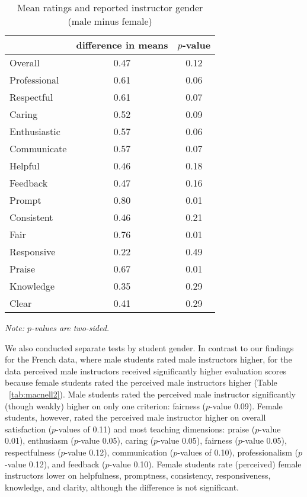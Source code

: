 \documentclass[12pt]{article}
\begin{document}
\begin{table}[htbp]
  \centering
  \footnotesize 
  \caption{Mean ratings and reported instructor gender (male minus female)}
    \begin{tabular}{lcc}
    \toprule 
                          & difference in means  & $p$-value  \\
   \midrule
    Overall &                 0.47       & 0.12   \\
    Professional &            0.61       & 0.06   \\
    Respectful			   &  0.61       & 0.07   \\
    Caring &                  0.52       & 0.09    \\
    Enthusiastic   &          0.57       & 0.06     \\
    Communicate        &      0.57       & 0.07     \\
    Helpful   &               0.46       & 0.18     \\
    Feedback   &              0.47       & 0.16     \\
    Prompt    &               0.80       & 0.01     \\
    Consistent   &            0.46       & 0.21     \\
    Fair   &                  0.76       & 0.01     \\
    Responsive   &            0.22       & 0.49     \\
    Praise   &                0.67       & 0.01     \\
    Knowledge   &             0.35       & 0.29     \\
    Clear   &                 0.41       & 0.29     \\
    \bottomrule
    \end{tabular}%
 \label{tab:macnell1}%
  
  \textit{Note: $p$-values are two-sided.}
\end{table}%
\normalsize


We also conducted separate tests by student gender.
In contrast to our findings for the French data, where male students 
rated male instructors higher, 
for the \citet{MacNell2014} data perceived male instructors received 
significantly higher evaluation scores because female students rated the perceived 
male instructors higher (Table ~\ref{tab:macnell2}). 
Male students rated the perceived male instructor significantly (though weakly) 
higher on only one criterion: fairness ($p$-value 0.09). 
Female students, however, rated the perceived male instructor higher on overall satisfaction 
($p$-values of 0.11) and most teaching dimensions: 
praise ($p$-value 0.01), 
enthusiasm ($p$-value 0.05), 
caring ($p$-value 0.05), 
fairness ($p$-value 0.05), 
respectfulness ($p$-value 0.12),  
communication ($p$-values of 0.10), 
professionalism ($p$-value 0.12), 
and feedback ($p$-value 0.10). 
Female students rate (perceived) female instructors lower on 
helpfulness, promptness, consistency, responsiveness, 
knowledge, and clarity, although the difference is not significant.
\end{document}
